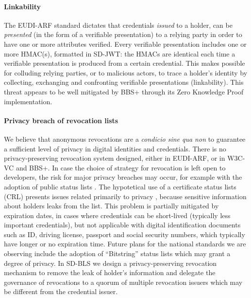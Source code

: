 \paragraph{Linkability}

The EUDI-ARF standard dictates that credentials \textit{issued} to a
holder, can be \textit{presented} (in the form of a verifiable
presentation) to a relying party in order to have one or more
attributes verified. Every verifiable presentation includes one or
more HMAC(s), formatted in SD-JWT: the HMACs are identical each time a
verifiable presentation is produced from a certain credential. This
makes possible for colluding relying parties, or to malicious actors,
to trace a holder's identity by collecting, exchanging and confronting
verifiable presentations (linkability). This threat appears to be well
mitigated by BBS+ through its Zero Knowledge Proof implementation.

\paragraph{Privacy breach of revocation lists}

We believe that anonymous revocations are a \textit{condicio sine qua
  non} to guarantee a sufficient level of privacy in digital
identities and credentials. There is no privacy-preserving revocation
system designed, either in EUDI-ARF, or in W3C-VC and BBS+. In case
the choice of strategy for revocation is left open to developers, the
risk for major privacy breaches may occur, for example with the
adoption of public status lists \cite{crlcomparison}. The hypotetical
use of a certificate status lists (CRL) presents issues related
primarily to privacy \cite{CRL}, because sensitive information about
holders leaks from the list. This problem is partially mitigated by
expiration dates, in cases where credentials can be short-lived
(typically less important credentials), but not applicable with
digital identification documents such as ID, driving license, passport
and social security numbers, which typically have longer or no
expiration time. Future plans for the national standards we are
observing include the adoption of ``Bitstring'' status lists
\cite{status-lists} which may grant a degree of privacy. In SD-BLS we
design a privacy-preserving revocation mechanism to remove the leak of
holder's information and delegate the governance of revocations to a
quorum of multiple revocation issuers which may be different from the
credential issuer.



